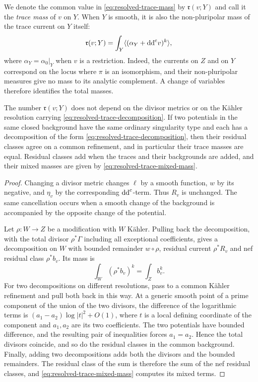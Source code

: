 We denote the common value in \eqref{eq:resolved-trace-mass} by $\mathfrak r(v;Y)$ and call it the \emph{trace mass} of $v$ on $Y$. When $Y$ is smooth, it is also the non-pluripolar mass of the trace current on $Y$ itself:
\[
 \mathfrak r(v;Y)=\int_Y\langle(\alpha_Y+\mathrm{dd}^{\mathrm{c}} v)^k\rangle,
\]
where $\alpha_Y=\alpha_0|_Y$ when $v$ is a restriction. Indeed, the currents on $Z$ and on $Y$ correspond on the locus where $\pi$ is an isomorphism, and their non-pluripolar measures give no mass to its analytic complement. A change of variables therefore identifies the total masses.

\begin{theorem}\label{thm:resolved-trace-invariance}
The number $\mathfrak r(v;Y)$ does not depend on the divisor metrics or on the K\"ahler resolution carrying \eqref{eq:resolved-trace-decomposition}. If two potentials in the same closed background have the same ordinary singularity type and each has a decomposition of the form \eqref{eq:resolved-trace-decomposition}, then their residual classes agree on a common refinement, and in particular their trace masses are equal. Residual classes add when the traces and their backgrounds are added, and their mixed masses are given by \eqref{eq:resolved-trace-mixed-mass}.
\end{theorem}
\begin{proof}
Changing a divisor metric changes $\ell$ by a smooth function, $w$ by its negative, and $\eta_v$ by the corresponding $\mathrm{dd}^{\mathrm{c}}$-term. Thus $R_v$ is unchanged. The same cancellation occurs when a smooth change of the background is accompanied by the opposite change of the potential.

Let $\rho\colon W\to Z$ be a modification with $W$ K\"ahler. Pulling back the decomposition, with the total divisor $\rho^*\Gamma$ including all exceptional coefficients, gives a decomposition on $W$ with bounded remainder $w\circ\rho$, residual current $\rho^*R_v$ and nef residual class $\rho^*b_v$. Its mass is
\[
 \int_W(\rho^*b_v)^k=\int_Zb_v^k.
\]
For two decompositions on different resolutions, pass to a common K\"ahler refinement and pull both back in this way. At a generic smooth point of a prime component of the union of the two divisors, the difference of the logarithmic terms is $(a_1-a_2)\log|t|^2+O(1)$, where $t$ is a local defining coordinate of the component and $a_1,a_2$ are its two coefficients. The two potentials have bounded difference, and the resulting pair of inequalities forces $a_1=a_2$. Hence the total divisors coincide, and so do the residual classes in the common background. Finally, adding two decompositions adds both the divisors and the bounded remainders. The residual class of the sum is therefore the sum of the nef residual classes, and \eqref{eq:resolved-trace-mixed-mass} computes its mixed terms.
\end{proof}

